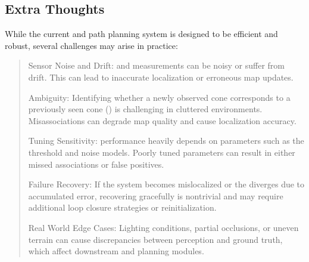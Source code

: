 \documentclass[letterpaper,10pt,english]{sphinxmanual}
\begin{document}
\subsection{Extra Thoughts}
\label{\detokenize{extraneous:extra-thoughts}}
\sphinxAtStartPar
While the current {\hyperref[\detokenize{glossary:term-SLAM}]{}} and path planning system is designed to be efficient and robust, several challenges may arise in practice:
\begin{quote}

\sphinxAtStartPar
Sensor Noise and Drift: {\hyperref[\detokenize{glossary:term-GPS}]{}} and {\hyperref[\detokenize{glossary:term-IMU}]{}} measurements can be noisy or suffer from drift. This can lead to inaccurate localization or erroneous map updates.

\sphinxAtStartPar
{\hyperref[\detokenize{glossary:term-Data-Association}]{}} Ambiguity: Identifying whether a newly observed cone corresponds to a previously seen cone ({\hyperref[\detokenize{glossary:term-Data-Association}]{}}) is challenging in cluttered environments. Misassociations can degrade map quality and cause localization accuracy.

\sphinxAtStartPar
Tuning Sensitivity: {\hyperref[\detokenize{glossary:term-SLAM}]{}} performance heavily depends on parameters such as the {\hyperref[\detokenize{glossary:term-Mahalanobis-Distance}]{}} threshold and noise models. Poorly tuned parameters can result in either missed associations or false positives.

\sphinxAtStartPar
Failure Recovery: If the system becomes mislocalized or the {\hyperref[\detokenize{glossary:term-Factor-Graph}]{}} diverges due to accumulated error, recovering gracefully is non\sphinxhyphen{}trivial and may require additional loop closure strategies or reinitialization.

\sphinxAtStartPar
Real World Edge Cases: Lighting conditions, partial occlusions, or uneven terrain can cause discrepancies between perception and ground truth, which affect downstream {\hyperref[\detokenize{glossary:term-SLAM}]{}} and planning modules.
\end{quote}
\end{document}
